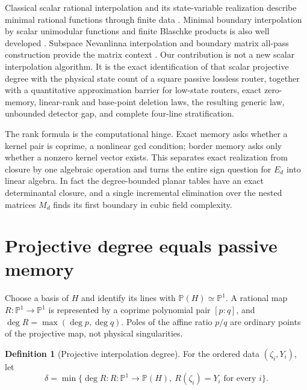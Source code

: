 \documentclass[11pt]{article}
\theoremstyle{definition}\newtheorem{definition}[theorem]{Definition}\newtheorem{example}[theorem]{Example}
\theoremstyle{remark}\newtheorem{remark}[theorem]{Remark}\newtheorem{limitation}[theorem]{Limitation}
\newcommand{\PP}{\mathbb P}\newcommand{\rank}{\operatorname{rank}}
\begin{document}
Classical scalar rational interpolation and its state-variable realization
describe minimal rational functions through finite data
\cite{AntoulasAnderson1986,AndersonAntoulas1990,AntoulasEtAl1990,CortadellasEtAl2020}.
Minimal boundary interpolation by scalar unimodular functions and finite
Blaschke products is also well developed
\cite{Glader2006,SemmlerWegert2006,Bolotnikov2018}.  Subspace Nevanlinna
interpolation and boundary matrix all-pass construction provide the matrix
context \cite{RapisardaWillems1997,BolotnikovDym2006,BharathEtAl2023}.
Our contribution is not a new scalar interpolation algorithm.  It is the exact
identification of that scalar projective degree with the physical state count of
a square passive lossless router, together with a quantitative approximation
barrier for low-state routers, exact zero-memory, linear-rank and base-point deletion laws,
the resulting generic law, unbounded detector gap, and complete four-line
stratification.

The rank formula is the computational hinge.  Exact memory asks whether a
kernel pair is coprime, a nonlinear gcd condition; border memory asks only
whether a nonzero kernel vector exists.  This separates exact realization from
closure by one algebraic operation and turns the entire sign question for
$E_d$ into linear algebra.  In fact the degree-bounded planar tables have an
exact determinantal closure, and a single incremental elimination over the
nested matrices $M_d$ finds its first boundary in cubic field complexity.

\section{Projective degree equals passive memory}

Choose a basis of $H$ and identify its lines with $\PP(H)\simeq\PP^1$.  A
rational map $R:\PP^1\to\PP^1$ is represented by a coprime polynomial pair
$[p:q]$, and $\deg R=\max(\deg p,\deg q)$.  Poles of the affine ratio $p/q$ are
ordinary points of the projective map, not physical singularities.

\begin{definition}[Projective interpolation degree]\label{def:delta}
For the ordered data $(\zeta_i,Y_i)$, let
\[
 \delta=\min\{\deg R:R:\PP^1\to\PP(H),\ R(\zeta_i)=Y_i\text{ for every }i\}.
\]
\end{definition}
\end{document}
